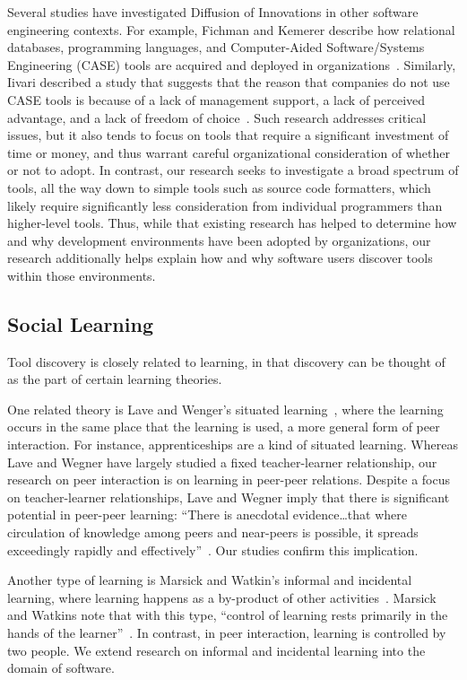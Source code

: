 \documentclass[smallextended]{svjour3}
\newcommand\discovery{peer interaction\xspace}
\begin{document}
Several studies have investigated Diffusion of Innovations in
other software engineering contexts.
For example, Fichman and Kemerer describe how relational databases, programming
languages, and Computer-Aided Software/Systems Engineering (CASE) tools are
acquired and deployed in organizations~\cite{fichman99}. 
Similarly, Iivari described a study that suggests that the reason that
companies do not use CASE tools is because of a lack of management support, a 
lack of perceived advantage, and a lack of freedom of choice~\cite{iivari}.
Such research addresses critical issues, but it also
tends to focus on tools that require a significant investment of time 
or money, and thus warrant careful organizational consideration of whether or
not to adopt. 
In contrast, our research seeks to investigate a broad spectrum of tools, all
the way down to simple tools such as source code formatters, which likely require
significantly less consideration from individual programmers than higher-level
tools. 
Thus, while that existing research has helped to determine
how and why development environments have been adopted by organizations, our
research additionally helps explain how and why software users discover tools within
those environments.

\subsection{Social Learning}

\noindent
Tool discovery is closely related to learning, in that discovery can be thought 
of as the part of certain learning theories.

One related theory is Lave and Wenger's situated learning~\cite{lave}, where the learning
occurs in the same place that the learning is used, a more general form of
\discovery.
For instance, apprenticeships are a kind of situated learning. 
Whereas Lave and Wegner have largely studied a fixed teacher-learner
relationship, our research on \discovery is on learning in peer-peer relations. 
Despite a focus on teacher-learner relationships, Lave and Wegner imply that
there is significant potential in peer-peer learning: ``There is anecdotal
evidence\ldots that where circulation of knowledge among peers and near-peers
is possible, it spreads exceedingly rapidly and effectively''~\cite{lave}.
Our studies confirm this implication.

Another type of learning is Marsick and Watkin's informal and incidental
learning, where learning happens as a by-product of other
activities~\cite{marsick01}. 
Marsick and Watkins note that with this type, ``control of learning
rests primarily in the hands of the learner''~\cite{marsick01}.
In contrast, in \discovery, learning is controlled by two people. 
We extend research on informal and incidental learning 
into the domain of software.
\end{document}
